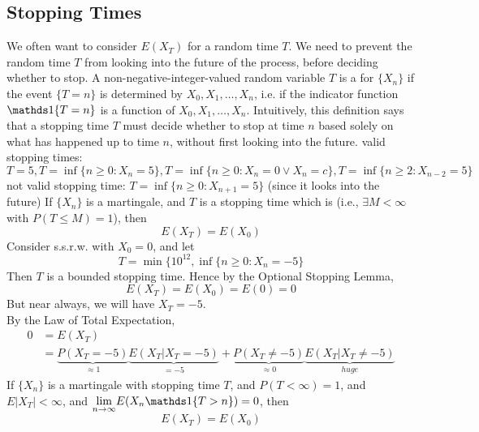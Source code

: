 \documentclass[11pt]{article}
\renewcommand{\limit}[1]{\underset{{#1} \rightarrow \infty}{\lim}}
\begin{document}
    \subsection{Stopping Times}
    We often want to consider $E(X_T)$ for a random time $T$. We need to prevent the random time $T$ from looking into the future of the process, before deciding whether to stop.
     A non-negative-integer-valued random variable $T$ is a  for $\{X_n\}$ if the event $\{T = n\}$ is determined by $X_0, X_1, \hdots, X_n$, i.e. if the indicator function $\id{T=n}$ is a function of $X_0, X_1, \hdots, X_n$.
    \remark
    Intuitively, this definition says that a stopping time $T$ must decide whether to stop at time $n$ based solely on what has happened up to time $n$, without first looking into the future.
    \example
    valid stopping times:\\
    $T=5, T=\inf\{n \geq 0: X_n = 5\}, T = \inf \{n \geq 0: X_n = 0 \lor X_n = c\}, T = \inf \{n \geq 2: X_{n-2} = 5\}$
    not valid stopping time:
    $T = \inf\{n \geq 0: X_{n+1} = 5\}$ (since it looks into the future)
     If $\{X_n\}$ is a martingale, and $T$ is a stopping time which is  (i.e., $\exists M < \infty$ with $P(T \leq M) = 1$), then 
    $$E(X_T) = E(X_0)$$
    \example
    Consider s.s.r.w. with $X_0 = 0$, and let
    $$T = \min\{ 10^{12}, \inf\{ n \geq 0: X_n = -5\}$$
    Then $T$ is a bounded stopping time. Hence by the Optional Stopping Lemma, 
    $$E(X_T) = E(X_0) = E(0) = 0$$
    But near always, we will have $X_T = -5$.\\
    By the Law of Total Expectation,
    \begin{align*}
    	0 &= E(X_T) \\
    	&= \underbrace{P(X_T = -5)}_{\approx 1}\underbrace{E(X_T|X_T = -5)}_{=-5} + \underbrace{P(X_T \neq -5)}_{\approx 0}\underbrace{E(X_T|X_T \neq -5)}_{huge}
    \end{align*}
     If $\{X_n\}$ is a martingale with stopping time $T$, and $P(T < \infty) = 1$, and $E|X_T| < \infty$, and $\limit{n} E(X_n \id{T > n}) = 0$, then
    $$E(X_T) = E(X_0)$$
\end{document}
